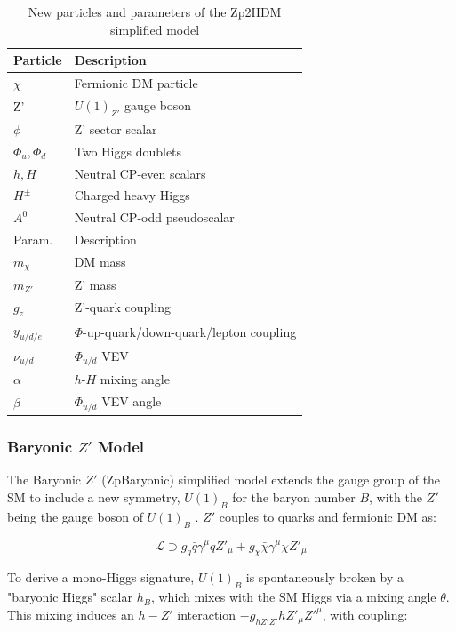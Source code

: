 \begin{table}[htbH]
\begin{center}
\begin{tabular}{ l | l}
\hline
Particle & Description \\
\hline
$\chi$ & Fermionic DM particle \\
Z' & $U(1)_{Z'}$ gauge boson \\
$\phi$ & Z' sector scalar \\
$\Phi_u, \Phi_d$ & Two Higgs doublets \\
$h, H$ & Neutral CP-even scalars \\
$H^\pm$ & Charged heavy Higgs \\
$A^0$ & Neutral CP-odd pseudoscalar \\
\hline
Param. & Description \\
\hline
$m_\chi$ & DM mass \\
$m_{Z'}$ & Z' mass \\
$g_z$ & Z'-quark coupling \\
$y_{u/d/e}$ & $\Phi$-up-quark/down-quark/lepton coupling \\
$\nu_{u/d}$ & $\Phi_{u/d}$ VEV \\
$\alpha$ & $h$-$H$ mixing angle \\
$\beta$ & $\Phi_{u/d}$ VEV angle \\
\hline
\end{tabular}
\caption{New particles and parameters of the Zp2HDM simplified model \cite{Carpenter:2013xra}}\label{tab:Zp2HDM}
\end{center}
\end{table}


\subsubsection{Baryonic $Z'$ Model}

The Baryonic $Z'$ (ZpBaryonic) simplified model extends the gauge group of the SM to include a new symmetry, $U(1)_B$ for the baryon number $B$, with the $Z'$ being the gauge boson of $U(1)_B$ \cite{Carone:1994aa, Agashe:2004bm, FileviezPerez:2010gw}. $Z'$ couples to quarks and fermionic DM as:

\begin{equation}
\mathcal{L} \supset g_q \bar{q} \gamma^\mu q Z'_\mu + g_\chi \bar{\chi} \gamma^\mu \chi Z'_\mu
\end{equation}

To derive a mono-Higgs signature, $U(1)_B$ is spontaneously broken by a "baryonic Higgs" scalar $h_B$, which mixes with the SM Higgs via a mixing angle $\theta$. This mixing induces an $h-Z'$ interaction $-g_{hZ'Z'} h Z'_\mu Z'^\mu$, with coupling:

